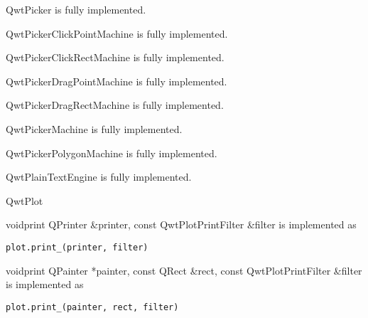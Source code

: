 \documentclass{manual}
\begin{document}
\begin{classdesc*}{QwtPicker}
  is fully implemented.
\end{classdesc*}

\begin{classdesc*}{QwtPickerClickPointMachine}
  is fully implemented.
\end{classdesc*}

\begin{classdesc*}{QwtPickerClickRectMachine}
  is fully implemented.
\end{classdesc*}

\begin{classdesc*}{QwtPickerDragPointMachine}
  is fully implemented.
\end{classdesc*}

\begin{classdesc*}{QwtPickerDragRectMachine}
  is fully implemented.
\end{classdesc*}

\begin{classdesc*}{QwtPickerMachine}
  is fully implemented.
\end{classdesc*}

\begin{classdesc*}{QwtPickerPolygonMachine}
  is fully implemented.
\end{classdesc*}

\begin{classdesc*}{QwtPlainTextEngine}
  is fully implemented.
\end{classdesc*}

\begin{classdesc*}{QwtPlot}

  \begin{cfuncdesc}{void}{print}{
      QPrinter \&printer, const QwtPlotPrintFilter \&filter}
    is implemented as
    \begin{verbatim}
plot.print_(printer, filter)
    \end{verbatim}
  \end{cfuncdesc}

  \begin{cfuncdesc}{void}{print}{
      QPainter *painter,
      const QRect \&rect,
      const QwtPlotPrintFilter \&filter}
    is implemented as
    \begin{verbatim}
plot.print_(painter, rect, filter)
    \end{verbatim}
  \end{cfuncdesc}

\end{classdesc*}
\end{document}
